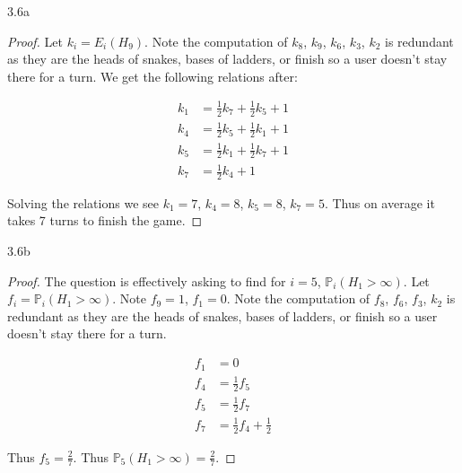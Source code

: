 \documentclass{article}
\newcommand{\PR}{\mathbb{P}}
\begin{document}
\bigskip

\begin{PROB}{3.6a}\label{Problem 3.6a.}
\end{PROB}
\begin{proof}
    Let $k_i = E_i(H_9)$. Note the computation of $k_8$, $k_9$, $k_6$, $k_3$, $k_2$ is redundant as they are the heads of snakes, bases of ladders, or finish so a user doesn't stay there for a turn. We get the following relations after:
    
    \begin{align*}
        k_1 &= \frac{1}{2}k_7 + \frac{1}{2}k_5 + 1\\
        k_4 &= \frac{1}{2}k_5 + \frac{1}{2}k_1 + 1\\
        k_5 &= \frac{1}{2}k_1 + \frac{1}{2}k_7 + 1\\
        k_7 &= \frac{1}{2}k_4 + 1
    \end{align*}

    Solving the relations we see $k_1 = 7$, $k_4 = 8$, $k_5 = 8$, $k_7 = 5$. Thus on average it takes 7 turns to finish the game.      
\end{proof}

\begin{PROB}{3.6b}\label{Problem 3.6b.}
\end{PROB}
\begin{proof}
    The question is effectively asking to find for $i = 5$, $\PR_i(H_1 > \infty)$. Let $f_i = \PR_i(H_1 > \infty)$. Note $f_9 = 1$, $f_1 = 0$. Note the computation of $f_8$, $f_6$, $f_3$, $k_2$ is redundant as they are the heads of snakes, bases of ladders, or finish so a user doesn't stay there for a turn.
    
    \begin{align*}
        f_1 &= 0 \\
        f_4 &= \frac{1}{2}f_5 \\
        f_5 &= \frac{1}{2}f_7 \\
        f_7 &= \frac{1}{2}f_4 + \frac{1}{2}
    \end{align*}

    Thus $f_5 = \frac{2}{7}$. Thus $\PR_5(H_1 > \infty) = \frac{2}{7}$.   
\end{proof}
\end{document}
